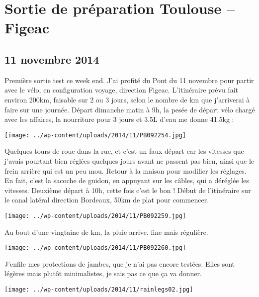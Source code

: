 \chapter{Sortie de préparation Toulouse – Figeac}
\section*{11 novembre 2014}
Première sortie test ce week end. J'ai profité du Pont du 11 novembre pour partir avec le vélo, en configuration voyage, direction Figeac. \newline
 L'itinéraire prévu fait environ 200km, faisable sur 2 ou 3 jours, selon le nombre de km que j'arriverai à faire sur une journée. \newline
 Départ dimanche matin à 9h, la pesée de départ vélo chargé avec les affaires, la nourriture pour 3 jours et 3.5L d'eau me donne 41.5kg : \newline
 \newline
\centerline{\texttt{[image: ../wp-content/uploads/2014/11/PB092254.jpg]} } 
 \newline
 Quelques tours de roue dans la rue, et c'est un faux départ car les vitesses que j'avais pourtant bien réglées quelques jours avant ne passent pas bien, ainsi que le frein arrière qui est un peu mou. Retour à la maison pour modifier les réglages. En fait, c'est la sacoche de guidon, en appuyant sur les câbles, qui a déréglée les vitesses. \newline
 Deuxième départ à 10h, cette fois c'est le bon ! \newline
 Début de l'itinéraire sur le canal latéral direction Bordeaux, 50km de plat pour commencer. \newline
 \newline
\centerline{\texttt{[image: ../wp-content/uploads/2014/11/PB092259.jpg]} } 
 \newline
 Au bout d'une vingtaine de km, la pluie arrive, fine mais régulière. \newline
 \newline
\centerline{\texttt{[image: ../wp-content/uploads/2014/11/PB092260.jpg]} } 
 \newline
 J'enfile mes protections de jambes, que je n'ai pas encore testées. Elles sont légères mais plutôt minimalistes, je sais pas ce que ça va donner. \newline
 \newline
\centerline{\texttt{[image: ../wp-content/uploads/2014/11/rainlegs02.jpg]} } 
